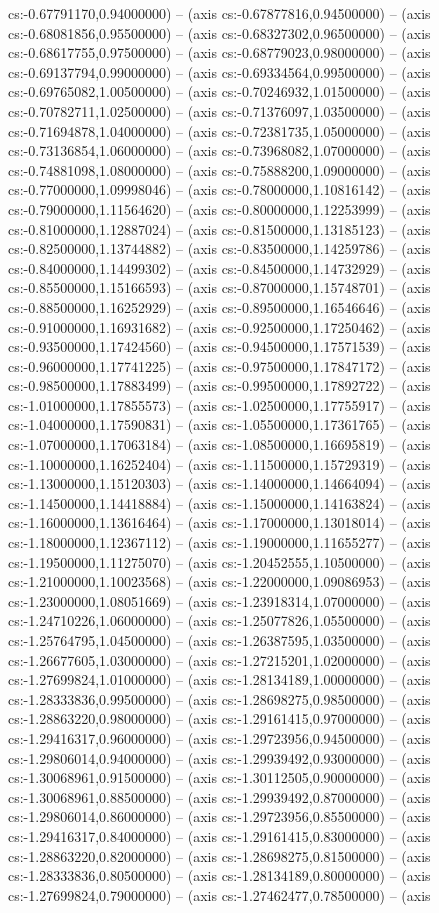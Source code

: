cs:-0.67791170,0.94000000) -- (axis cs:-0.67877816,0.94500000) -- (axis cs:-0.68081856,0.95500000) -- (axis cs:-0.68327302,0.96500000) -- (axis cs:-0.68617755,0.97500000) -- (axis cs:-0.68779023,0.98000000) -- (axis cs:-0.69137794,0.99000000) -- (axis cs:-0.69334564,0.99500000) -- (axis cs:-0.69765082,1.00500000) -- (axis cs:-0.70246932,1.01500000) -- (axis cs:-0.70782711,1.02500000) -- (axis cs:-0.71376097,1.03500000) -- (axis cs:-0.71694878,1.04000000) -- (axis cs:-0.72381735,1.05000000) -- (axis cs:-0.73136854,1.06000000) -- (axis cs:-0.73968082,1.07000000) -- (axis cs:-0.74881098,1.08000000) -- (axis cs:-0.75888200,1.09000000) -- (axis cs:-0.77000000,1.09998046) -- (axis cs:-0.78000000,1.10816142) -- (axis cs:-0.79000000,1.11564620) -- (axis cs:-0.80000000,1.12253999) -- (axis cs:-0.81000000,1.12887024) -- (axis cs:-0.81500000,1.13185123) -- (axis cs:-0.82500000,1.13744882) -- (axis cs:-0.83500000,1.14259786) -- (axis cs:-0.84000000,1.14499302) -- (axis cs:-0.84500000,1.14732929) -- (axis cs:-0.85500000,1.15166593) -- (axis cs:-0.87000000,1.15748701) -- (axis cs:-0.88500000,1.16252929) -- (axis cs:-0.89500000,1.16546646) -- (axis cs:-0.91000000,1.16931682) -- (axis cs:-0.92500000,1.17250462) -- (axis cs:-0.93500000,1.17424560) -- (axis cs:-0.94500000,1.17571539) -- (axis cs:-0.96000000,1.17741225) -- (axis cs:-0.97500000,1.17847172) -- (axis cs:-0.98500000,1.17883499) -- (axis cs:-0.99500000,1.17892722) -- (axis cs:-1.01000000,1.17855573) -- (axis cs:-1.02500000,1.17755917) -- (axis cs:-1.04000000,1.17590831) -- (axis cs:-1.05500000,1.17361765) -- (axis cs:-1.07000000,1.17063184) -- (axis cs:-1.08500000,1.16695819) -- (axis cs:-1.10000000,1.16252404) -- (axis cs:-1.11500000,1.15729319) -- (axis cs:-1.13000000,1.15120303) -- (axis cs:-1.14000000,1.14664094) -- (axis cs:-1.14500000,1.14418884) -- (axis cs:-1.15000000,1.14163824) -- (axis cs:-1.16000000,1.13616464) -- (axis cs:-1.17000000,1.13018014) -- (axis cs:-1.18000000,1.12367112) -- (axis cs:-1.19000000,1.11655277) -- (axis cs:-1.19500000,1.11275070) -- (axis cs:-1.20452555,1.10500000) -- (axis cs:-1.21000000,1.10023568) -- (axis cs:-1.22000000,1.09086953) -- (axis cs:-1.23000000,1.08051669) -- (axis cs:-1.23918314,1.07000000) -- (axis cs:-1.24710226,1.06000000) -- (axis cs:-1.25077826,1.05500000) -- (axis cs:-1.25764795,1.04500000) -- (axis cs:-1.26387595,1.03500000) -- (axis cs:-1.26677605,1.03000000) -- (axis cs:-1.27215201,1.02000000) -- (axis cs:-1.27699824,1.01000000) -- (axis cs:-1.28134189,1.00000000) -- (axis cs:-1.28333836,0.99500000) -- (axis cs:-1.28698275,0.98500000) -- (axis cs:-1.28863220,0.98000000) -- (axis cs:-1.29161415,0.97000000) -- (axis cs:-1.29416317,0.96000000) -- (axis cs:-1.29723956,0.94500000) -- (axis cs:-1.29806014,0.94000000) -- (axis cs:-1.29939492,0.93000000) -- (axis cs:-1.30068961,0.91500000) -- (axis cs:-1.30112505,0.90000000) -- (axis cs:-1.30068961,0.88500000) -- (axis cs:-1.29939492,0.87000000) -- (axis cs:-1.29806014,0.86000000) -- (axis cs:-1.29723956,0.85500000) -- (axis cs:-1.29416317,0.84000000) -- (axis cs:-1.29161415,0.83000000) -- (axis cs:-1.28863220,0.82000000) -- (axis cs:-1.28698275,0.81500000) -- (axis cs:-1.28333836,0.80500000) -- (axis cs:-1.28134189,0.80000000) -- (axis cs:-1.27699824,0.79000000) -- (axis cs:-1.27462477,0.78500000) -- (axis 